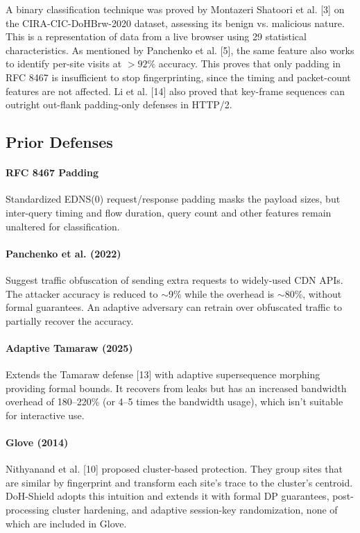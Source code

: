 \documentclass[conference]{IEEEtran}
\begin{document}
A binary classification technique was proved by Montazeri Shatoori et al. [3] on the CIRA-CIC-DoHBrw-2020 dataset, assessing its benign vs. malicious nature. This is a representation of data from a live browser using 29 statistical characteristics. As mentioned by Panchenko et al. [5], the same feature also works to identify per-site visits at $>92\%$ accuracy. This proves that only padding in RFC 8467 is insufficient to stop fingerprinting, since the timing and packet-count features are not affected. Li et al. [14] also proved that key-frame sequences can outright out-flank padding-only defenses in HTTP/2.

\subsection{Prior Defenses}
\paragraph{RFC 8467 Padding} Standardized EDNS(0) request/response padding masks the payload sizes, but inter-query timing and flow duration, query count and other features remain unaltered for classification.

\paragraph{Panchenko et al. (2022)} Suggest traffic obfuscation of sending extra requests to widely-used CDN APIs. The attacker accuracy is reduced to $\sim$9\% while the overhead is $\sim$80\%, without formal guarantees. An adaptive adversary can retrain over obfuscated traffic to partially recover the accuracy.

\paragraph{Adaptive Tamaraw (2025)} Extends the Tamaraw defense [13] with adaptive supersequence morphing providing formal bounds. It recovers from leaks but has an increased bandwidth overhead of 180--220\% (or 4--5 times the bandwidth usage), which isn't suitable for interactive use.

\paragraph{Glove (2014)} Nithyanand et al. [10] proposed cluster-based protection. They group sites that are similar by fingerprint and transform each site's trace to the cluster's centroid. DoH-Shield adopts this intuition and extends it with formal DP guarantees, post-processing cluster hardening, and adaptive session-key randomization, none of which are included in Glove.
\end{document}
